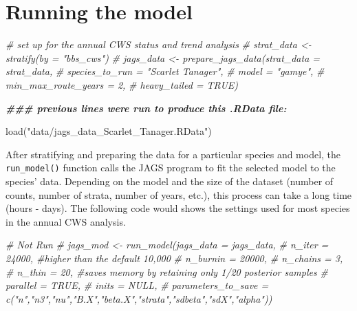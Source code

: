 \documentclass[
]{book}
\newenvironment{Shaded}{\begin{snugshade}}{\end{snugshade}}
\newcommand{\CommentTok}[1]{\textcolor[rgb]{0.56,0.35,0.01}{\textit{#1}}}
\newcommand{\DocumentationTok}[1]{\textcolor[rgb]{0.56,0.35,0.01}{\textbf{\textit{#1}}}}
\newcommand{\FunctionTok}[1]{\textcolor[rgb]{0.00,0.00,0.00}{#1}}
\newcommand{\NormalTok}[1]{#1}
\newcommand{\StringTok}[1]{\textcolor[rgb]{0.31,0.60,0.02}{#1}}
\begin{document}
\hypertarget{ModelRun}{%
\chapter{Running the model}\label{ModelRun}}

\begin{Shaded}
\begin{Highlighting}[]
\CommentTok{\# set up for the annual CWS status and trend analysis}
\CommentTok{\# strat\_data \textless{}{-} stratify(by = "bbs\_cws")}
\CommentTok{\# jags\_data \textless{}{-} prepare\_jags\_data(strat\_data = strat\_data,}
\CommentTok{\#                   species\_to\_run = "Scarlet Tanager",}
\CommentTok{\#                   model = "gamye",}
\CommentTok{\#                   min\_max\_route\_years = 2,}
\CommentTok{\#                   heavy\_tailed = TRUE)}

\DocumentationTok{\#\#\# previous lines were run to produce this .RData file:}

\FunctionTok{load}\NormalTok{(}\StringTok{"data/jags\_data\_Scarlet\_Tanager.RData"}\NormalTok{)}
\end{Highlighting}
\end{Shaded}

After stratifying and preparing the data for a particular species and model, the \texttt{run\_model()} function calls the JAGS program to fit the selected model to the species' data.
Depending on the model and the size of the dataset (number of counts, number of strata, number of years, etc.), this process can take a long time (hours - days). The following code would shows the settings used for most species in the annual CWS analysis.

\begin{Shaded}
\begin{Highlighting}[]
    \CommentTok{\# Not Run}
    \CommentTok{\# jags\_mod \textless{}{-} run\_model(jags\_data = jags\_data,}
    \CommentTok{\#                            n\_iter = 24000, \#higher than the default 10,000}
    \CommentTok{\#                            n\_burnin = 20000,}
    \CommentTok{\#                            n\_chains = 3,}
    \CommentTok{\#                            n\_thin = 20, \#saves memory by retaining only 1/20 posterior samples}
    \CommentTok{\#                            parallel = TRUE,}
    \CommentTok{\#                       inits = NULL,}
    \CommentTok{\#                       parameters\_to\_save = c("n","n3","nu","B.X","beta.X","strata","sdbeta","sdX","alpha"))}
 
\end{Highlighting}
\end{Shaded}
\end{document}
